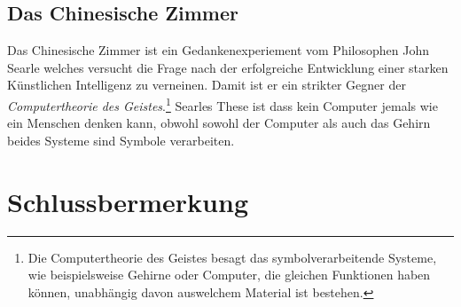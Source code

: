\documentclass[12pt]{report}
\begin{document}
    \section{Das Chinesische Zimmer}
    Das Chinesische Zimmer ist ein Gedankenexperiement vom Philosophen John Searle welches
    versucht die Frage nach der erfolgreiche Entwicklung einer starken Künstlichen Intelligenz zu verneinen.
    Damit ist er ein strikter Gegner der \emph{Computertheorie des Geistes}.\footnote{Die Computertheorie des Geistes besagt
    das symbolverarbeitende Systeme, wie beispielsweise Gehirne oder Computer, die gleichen Funktionen haben können,
    unabhängig davon auswelchem Material ist bestehen.} Searles These ist dass kein Computer jemals wie ein Menschen denken
    kann, obwohl sowohl der Computer als auch das Gehirn beides Systeme sind Symbole verarbeiten.\cite{nimtz2013chinesische}



    \chapter{Schlussbermerkung}

    \printbibliography
\end{document}
